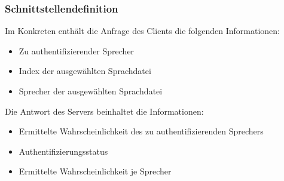 \subsubsection{Schnittstellendefinition}
Im Konkreten enthält die Anfrage des Clients die folgenden Informationen:
\begin{itemize}
    \item Zu authentifizierender Sprecher
    \item Index der ausgewählten Sprachdatei
    \item Sprecher der ausgewählten Sprachdatei
\end{itemize}
Die Antwort des Servers beinhaltet die Informationen:
\begin{itemize}
    \item Ermittelte Wahrscheinlichkeit des zu authentifizierenden Sprechers
    \item Authentifizierungsstatus
    \item Ermittelte Wahrscheinlichkeit je Sprecher
\end{itemize}